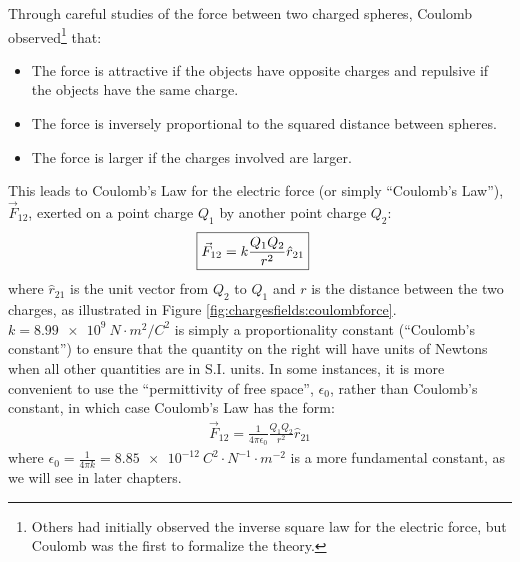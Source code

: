 Through careful studies of the force between two charged spheres, Coulomb observed\footnote{Others had initially observed the inverse square law for the electric force, but Coulomb was the first to formalize the theory.} that:
\begin{itemize}
\item The force is attractive if the objects have opposite charges and repulsive if the objects have the same charge.
\item The force is inversely proportional to the squared distance between spheres.
\item The force is larger if the charges involved are larger. 
\end{itemize}
This leads to Coulomb's Law for the electric force (or simply ``Coulomb's Law''), $\vec F_{12}$, exerted on a point charge $Q_1$ by another point charge $Q_2$:
\begin{align*}
\Aboxed{\vec F_{12}=k\frac{Q_1Q_2}{r^2}\hat r_{21}}
\end{align*}
where $\hat r_{21}$ is the unit vector from $Q_2$ to $Q_1$ and $r$ is the distance between the two charges, as illustrated in Figure \ref{fig:chargesfields:coulombforce}. $k=\SI{8.99e9}{N\cdot m^2/C^{2}}$ is simply a proportionality constant (``Coulomb's constant'') to ensure that the quantity on the right will have units of Newtons when all other quantities are in S.I. units. In some instances, it is more convenient to use the ``permittivity of free space'', $\epsilon_0$, rather than Coulomb's constant, in which case Coulomb's Law has the form:
\begin{align*}
\vec F_{12}=\frac{1}{4\pi\epsilon_0}\frac{Q_1Q_2}{r^2}\hat r_{21}
\end{align*}
where $\epsilon_0=\frac{1}{4\pi k}=\SI{8.85e-12}{C^2\cdot N^{-1}\cdot m^{-2}}$ is a more fundamental constant, as we will see in later chapters.

